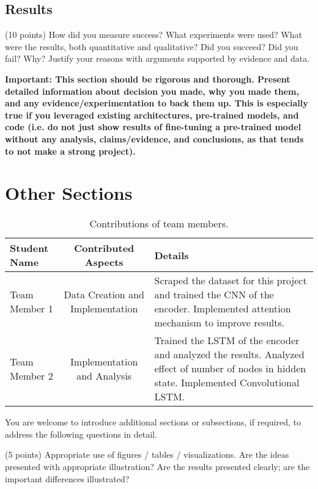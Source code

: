\documentclass[10pt,twocolumn,letterpaper]{article}
\begin{document}
\subsection*{Results}
(10 points) How did you measure success? What experiments were used? What were the results, both quantitative and qualitative? Did you succeed? Did you fail? Why? Justify your reasons with arguments supported by evidence and data.

\textbf{Important: This section should be rigorous and thorough. Present detailed information about decision you made, why you made them, and any evidence/experimentation to back them up. This is especially true if you leveraged existing architectures, pre-trained models, and code (i.e. do not just show results of fine-tuning a pre-trained model without any analysis, claims/evidence, and conclusions, as that tends to not make a strong project). }

\section{Other Sections}

\begin{table*}
\begin{center}
\begin{tabular}{|l|c|p{8cm}|}
\hline
Student Name & Contributed Aspects & Details \\
\hline\hline
Team Member 1 & Data Creation and Implementation & Scraped the dataset for this project and trained the CNN of the encoder. Implemented attention mechanism to improve results. \\
Team Member 2 & Implementation and Analysis & Trained the LSTM of the encoder and analyzed the results. Analyzed effect of number of nodes in hidden state.  Implemented Convolutional LSTM. \\
\hline
\end{tabular}
\end{center}
\caption{Contributions of team members.}
\label{tab:contributions}
\end{table*}



You are welcome to introduce additional sections or subsections, if required, to address the following questions in detail. 

(5 points) Appropriate use of figures / tables / visualizations. Are the ideas presented with appropriate illustration? Are the results presented clearly; are the important differences illustrated? 
\end{document}
